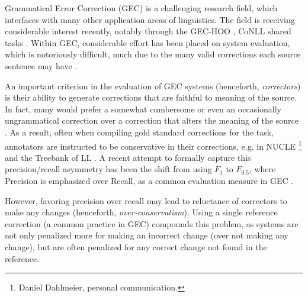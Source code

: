 	
	Grammatical Error Correction (GEC) is a challenging research field, which interfaces with many
	other application areas of linguistics. The field is receiving considerable
	interest recently, notably through the GEC-HOO \cite{dale2011helping,dale2012hoo},
	CoNLL shared tasks \cite{kao2013conll,ng2014conll}.
	Within GEC, considerable effort has been placed on system evaluation,
	which is notoriously difficult,
	much due to the many valid corrections each source sentence may have
	\cite{tetreault2008native,madnani2011they,chodorow2012problems,dahlmeier2012better}.
	
	An important criterion in the evaluation of GEC systems (henceforth, {\it correctors})
	is their ability to generate corrections that are faithful to meaning of the source. In fact, many would prefer
	a somewhat cumbersome or even an occasionally ungrammatical correction over a correction
	that alters the meaning of the source \cite{brockett2006correcting}.
	As a result, often when compiling gold standard corrections for the task,
	annotators are instructed to be conservative in their corrections, e.g. in NUCLE \footnote{Daniel Dahlmeier, personal communication.} and the Treebank of LL .
	A recent attempt to formally capture this precision/recall asymmetry has
	been the shift from using $F_1$ to $F_{0.5}$, where Precision is
	emphasized over Recall, as a common evaluation measure
	in GEC \cite{dahlmeier2012better}.
	
	However, favoring precision over recall may lead to reluctance of correctors to make any changes (henceforth, {\it over-conservatism}).
	Using a single reference correction (a common practice in GEC) compounds this problem,
	as systems are not only penalized more for making an incorrect change (over not making
	any change), but are often penalized for any correct change not found in the reference.
	
